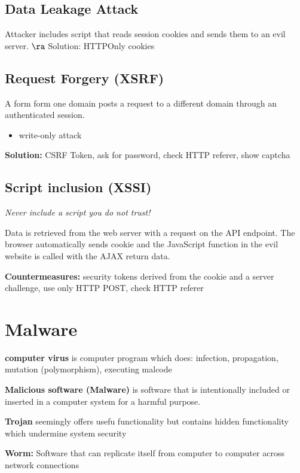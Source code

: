 \documentclass[fs, footer]{latex4ei}
\begin{document}
\begin{multicols*}{4}
\subsection{Data Leakage Attack}
Attacker includes script that reads session cookies and sends them to an evil server. $\ra$ Solution: HTTPOnly cookies

\subsection{Request Forgery (XSRF)}
A form form one domain posts a request to a different domain through an authenticated session.

\begin{itemize}
  \item write-only attack
\end{itemize}

\textbf{Solution:} CSRF Token, ask for password, check HTTP referer, show captcha

\subsection{Script inclusion (XSSI)}

\emph{Never include a script you do not trust!}

Data is retrieved from the web server with a request on the API endpoint. The browser automatically sends cookie and the JavaScript function in the evil website is called with the AJAX return data.

\textbf{Countermeasures:} security tokens derived from the cookie and a server challenge, use only HTTP POST, check HTTP referer

\section{Malware}

\textbf{computer virus} is computer program which does: infection, propagation, mutation (polymorphism), executing malcode

\textbf{Malicious software (Malware)} is software that is intentionally included or inserted in a computer system for a harmful purpose.

\textbf{Trojan} seemingly offers usefu functionality but contains hidden functionality which undermine system security

\textbf{Worm:} Software that can replicate itself from computer to computer across network connections


\end{multicols*}
\end{document}
